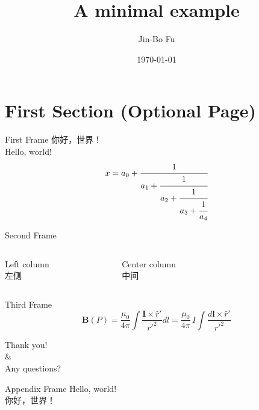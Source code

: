 \documentclass{presentation}
\title{A minimal example}
\date{\today}
\author{Jin-Bo Fu}
\institute{Astronomy Dept., Xiamen Univ.}
\begin{document}
\maketitle
\section{First Section (Optional Page)}
\begin{frame}{First Frame}
	你好，世界！  \\
	Hello, world! \\
	\begin{equation}
		x = a_0 + \cfrac{1}{a_1 
			+ \cfrac{1}{a_2 
				+ \cfrac{1}{a_3 + \cfrac{1}{a_4} } } }
	\end{equation}
\end{frame}

\begin{frame}{Second Frame}
	\begin{columns}
		\begin{column}{0.33\textwidth}
			Left column \\
			左侧
		\end{column}
		\begin{column}{0.33\textwidth}
			\centering
			Center column \\
			中间
		\end{column}
		\begin{column}{0.33\textwidth}
			 \\
		\end{column}
	\end{columns}
\end{frame}

\begin{frame}{Third Frame}
	\begin{equation}
		\mathbf{B}(P) = \frac{\mu_0}{4\pi}
		\int\frac{\mathbf{I}\times\hat{r}'}{r'^2}dl = \frac{\mu_0}{4\pi}\,I\!
		\int\frac{d\boldsymbol{l}\times\hat{r}'}{r'^2}
	\end{equation}
\end{frame}

\begin{frame}[standout]
	Thank you! \\
	\& \\
	Any questions? 
\end{frame}

\appendix
\begin{frame}{Appendix Frame}
	Hello, world!  \\
	你好，世界！
\end{frame}
\end{document}
